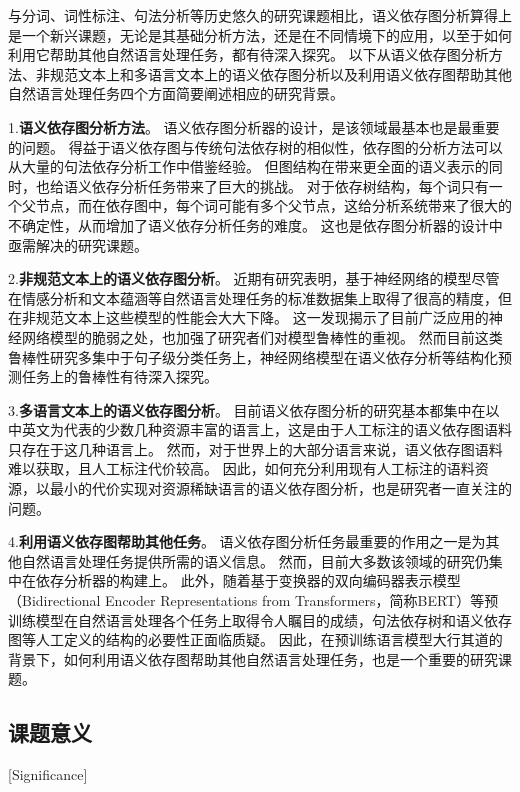 与分词、词性标注、句法分析等历史悠久的研究课题相比，语义依存图分析算得上是一个新兴课题，无论是其基础分析方法，还是在不同情境下的应用，以至于如何利用它帮助其他自然语言处理任务，都有待深入探究。
以下从语义依存图分析方法、非规范文本上和多语言文本上的语义依存图分析以及利用语义依存图帮助其他自然语言处理任务四个方面简要阐述相应的研究背景。

1.\textbf{语义依存图分析方法}。
语义依存图分析器的设计，是该领域最基本也是最重要的问题。
得益于语义依存图与传统句法依存树的相似性，依存图的分析方法可以从大量的句法依存分析工作中借鉴经验。
但图结构在带来更全面的语义表示的同时，也给语义依存分析任务带来了巨大的挑战。
对于依存树结构，每个词只有一个父节点，而在依存图中，每个词可能有多个父节点，这给分析系统带来了很大的不确定性，从而增加了语义依存分析任务的难度。
这也是依存图分析器的设计中亟需解决的研究课题。

2.\textbf{非规范文本上的语义依存图分析}。
近期有研究表明，基于神经网络的模型尽管在情感分析\cite{zhang-etal-2019-generating}和文本蕴涵\cite{jin-etal-2020-isbert}等自然语言处理任务的标准数据集上取得了很高的精度，但在非规范文本上这些模型的性能会大大下降。
这一发现揭示了目前广泛应用的神经网络模型的脆弱之处，也加强了研究者们对模型鲁棒性的重视。
然而目前这类鲁棒性研究多集中于句子级分类任务上，神经网络模型在语义依存分析等结构化预测任务上的鲁棒性有待深入探究。

3.\textbf{多语言文本上的语义依存图分析}。
目前语义依存图分析的研究基本都集中在以中英文为代表的少数几种资源丰富的语言上，这是由于人工标注的语义依存图语料只存在于这几种语言上。
然而，对于世界上的大部分语言来说，语义依存图语料难以获取，且人工标注代价较高。
因此，如何充分利用现有人工标注的语料资源，以最小的代价实现对资源稀缺语言的语义依存图分析，也是研究者一直关注的问题。

4.\textbf{利用语义依存图帮助其他任务}。
语义依存图分析任务最重要的作用之一是为其他自然语言处理任务提供所需的语义信息。
然而，目前大多数该领域的研究仍集中在依存分析器的构建上。
此外，随着基于变换器的双向编码器表示模型（Bidirectional Encoder Representations from Transformers，简称BERT）\cite{devlin-etal-2018-bert}等预训练模型在自然语言处理各个任务上取得令人瞩目的成绩，句法依存树和语义依存图等人工定义的结构的必要性正面临质疑。
因此，在预训练语言模型大行其道的背景下，如何利用语义依存图帮助其他自然语言处理任务，也是一个重要的研究课题。


\subsection{课题意义}[Significance]

